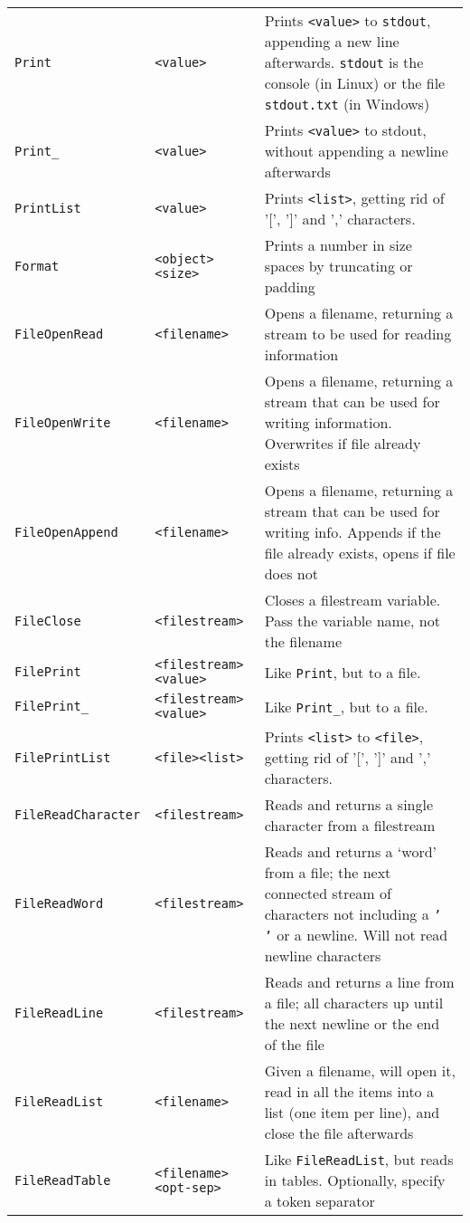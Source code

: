 \begin{longtable}{p{3cm}p{3cm}p{6cm}}
\verb+Print+ &\verb+<value>+ &Prints \verb+<value>+ to \texttt{stdout}, appending a new line afterwards. \texttt{stdout} is the console (in Linux) or the file \texttt{stdout.txt} (in Windows)\\ 
\verb+Print_+ &\verb+<value>+ &Prints \verb+<value>+ to stdout, without appending a newline afterwards\\ 
\verb+PrintList+&\verb+<value>+ &Prints \verb+<list>+, getting rid of '[', ']' and ',' characters.\\ 
\verb+Format+ &\verb+<object>+ \verb+<size>+ &Prints a number in size spaces by truncating or padding \\ 
\verb+FileOpenRead+ &\verb+<filename>+ &Opens a filename, returning a stream to be used for reading information\\ 
\verb+FileOpenWrite+ &\verb+<filename>+ &Opens a filename, returning a stream that can be used for writing information. Overwrites if file already exists\\ 
\verb+FileOpenAppend+ &\verb+<filename>+ &Opens a filename, returning a stream that can be used for writing info. Appends if the file already exists, opens if file does not\\ 
\verb+FileClose+ &\verb+<filestream>+&Closes a filestream variable. Pass the variable name, not the filename\\ 
\verb+FilePrint+ &\verb+<filestream>+ \verb+<value>+ &Like \verb+Print+, but to a file.\\ 
\verb+FilePrint_+ &\verb+<filestream>+ \verb+<value>+ &Like \verb+Print_+, but to a file.\\ 
\verb+FilePrintList+&\verb+<file>+\verb+<list>+ &Prints \verb+<list>+ to \verb+<file>+, getting rid of '[', ']' and ',' characters.\\ 
\verb+FileReadCharacter+ &\verb+<filestream>+ &Reads and returns a single character from a filestream\\ 
\verb+FileReadWord+ &\verb+<filestream>+&Reads and returns a `word' from a file; the next connected stream of characters not including a \texttt{' '} or a newline. Will not read newline characters\\ 
\verb+FileReadLine+ &\verb+<filestream>+&Reads and returns a line from a file; all characters up until the next newline or the end of the file\\ 
\verb+FileReadList+ &\verb+<filename>+ &Given a filename, will open it, read in all the items into a list (one item per line), and close the file afterwards\\ 
\verb+FileReadTable+ &\verb+<filename>+ \verb+<opt-sep>+ &Like \verb+FileReadList+, but reads in tables. Optionally, specify a token separator\\ 

\end{longtable}
